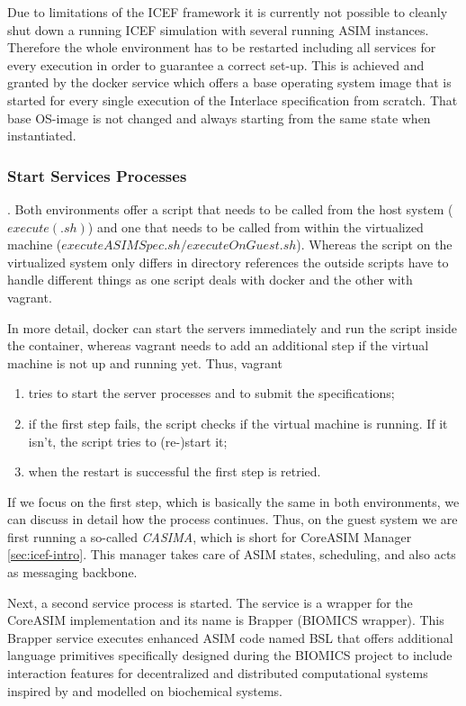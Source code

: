 Due to limitations of the ICEF framework it is currently not possible to cleanly shut down a running ICEF simulation with several running ASIM instances. Therefore the whole environment has to be restarted including all services for every execution in order to guarantee a correct set-up. This is achieved and granted by the docker service which offers a base operating system image that is started for every single execution of the Interlace specification from scratch. That base OS-image is not changed and always starting from the same state when instantiated.

\subsubsection{Start Services Processes}. Both environments offer a script that needs to be called from the host system ($execute(.sh)$) and one that needs to be called from within the virtualized machine ($executeASIMSpec.sh/executeOnGuest.sh$). Whereas the script on the virtualized system only differs in directory references the outside scripts have to handle different things as one script deals with docker and the other with vagrant.

In more detail, docker can start the servers immediately and run the script inside the container, whereas vagrant needs to add an additional step if the virtual machine is not up and running yet. Thus, vagrant
\begin{enumerate}
\vspace{-0.5cm}
	\item tries to start the server processes and to submit the specifications;
	\item if the first step fails, the script checks if the virtual machine is running. If it isn't, the script tries to (re-)start it;
	\item when the restart is successful the first step is retried.
\end{enumerate}

If we focus on the first step, which is basically the same in both environments, we can discuss in detail how the process continues. Thus, on the guest system we are first running a so-called \textit{CASIMA}, which is short for CoreASIM Manager \ref{sec:icef-intro}. This manager takes care of ASIM states, scheduling, and also acts as messaging backbone.

Next, a second service process is started. The service is a wrapper for the CoreASIM implementation and its name is Brapper (BIOMICS wrapper). This Brapper service executes enhanced ASIM code named BSL that offers additional language primitives specifically designed during the BIOMICS project to include interaction features for decentralized and distributed computational systems inspired by and modelled on biochemical systems.

